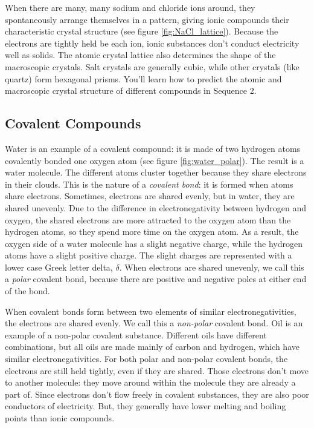 When there are many, many sodium and chloride ions around, 
they spontaneously arrange themselves in a pattern, giving ionic compounds their
characteristic crystal structure (see figure \ref{fig:NaCl_lattice}). Because the 
electrons are tightly held be each ion, ionic substances don't conduct electricity
well as solids. The atomic crystal lattice also determines the shape of the 
macroscopic crystals. Salt crystals are generally cubic, while other crystals 
(like quartz) form hexagonal prisms. You'll learn how to predict the atomic and 
macroscopic crystal structure of different compounds in Sequence 2. 

\subsection{Covalent Compounds}
Water is an example of a covalent compound: it is made of two hydrogen atoms 
covalently bonded one oxygen atom (see figure \ref{fig:water_polar}). The result 
is a water molecule. The different atoms cluster together 
because they share electrons in their clouds. This is the nature of a 
\textit{covalent bond}: it is formed when atoms share electrons.
Sometimes, electrons are shared evenly, but in water, they are shared unevenly. 
Due to the difference in electronegativity between hydrogen and oxygen, the 
shared electrons are more attracted to the oxygen atom than the hydrogen atoms, 
so they spend more time on the oxygen atom. As a result, the oxygen side of a 
water molecule has a slight negative charge, while the hydrogen atoms have a 
slight positive charge. The slight charges are represented with a lower case 
Greek letter delta, $\delta$. When electrons are shared unevenly, we call this a
\textit{polar} covalent bond, because there are positive and negative poles at 
either end of the bond.  

When covalent bonds form between two elements of similar electronegativities, 
the electrons are shared evenly. We call this a \textit{non-polar} covalent bond. 
Oil is an example of a non-polar covalent substance. Different oils have different
combinations, but all oils are made mainly of carbon and hydrogen, which have similar
electronegativities. For both polar and non-polar covalent bonds, the electrons 
are still held tightly, even if they are shared. Those electrons don't move to 
another molecule: they move around within the molecule they are already a part 
of. Since electrons don't flow freely in covalent substances, they are also poor 
conductors of electricity. But, they generally have lower melting and boiling 
points than ionic compounds. 

